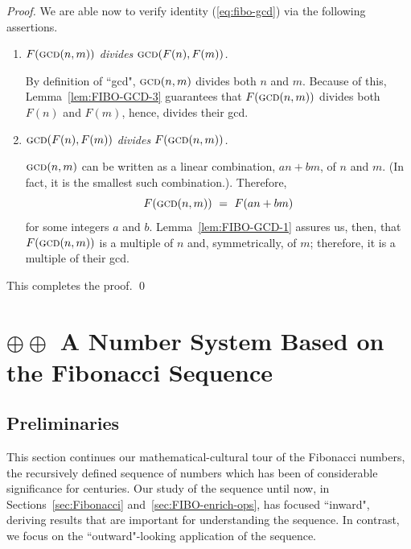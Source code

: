 \begin{proof}
\medskip

\noindent
We are able now to verify identity (\ref{eq:fibo-gcd}) via the following assertions.

\medskip

\begin{enumerate}
\item
{\em $F(\mbox{\sc gcd}(n,m))$ divides $\mbox{\sc gcd}(F(n), F(m))$.}

\smallskip

By definition of ``{\sc gcd}", $\mbox{\sc gcd}(n,m)$ divides both $n$ and $m$.  Because of this,
Lemma~\ref{lem:FIBO-GCD-3} guarantees that $F(\mbox{\sc gcd}(n,m))$ divides both $F(n)$ and $F(m)$, hence, divides their {\sc gcd}.

\medskip

\item
{\em $\mbox{\sc gcd}(F(n), F(m))$ divides $F(\mbox{\sc gcd}(n,m))$.}

\smallskip

$\mbox{\sc gcd}(n,m)$ can be written as a linear combination, $a n + b m$, of $n$ and $m$.  (In fact, it is the smallest such combination.). Therefore, 
\[ F(\mbox{\sc gcd}(n,m)) \ = \ F(a n + b m) \]
for some integers $a$ and $b$.  Lemma~\ref{lem:FIBO-GCD-1} assures us, then, that
$F(\mbox{\sc gcd}(n,m))$ is a multiple of $n$ and, symmetrically, of $m$; therefore, it is a multiple of their {\sc gcd}. 
\end{enumerate}
This completes the proof.   \qed
\end{proof}


\section{$\oplus \oplus$ A Number System Based on the Fibonacci Sequence}
\label{sec:numerals-special-families}
\label{sec:Fibo-numbers}

\subsection{Preliminaries}
\label{sec:FIBO-num-intro}

This section continues our mathematical-cultural tour of the Fibonacci numbers, the recursively defined sequence of numbers which has been of considerable significance for centuries.  Our study of the sequence until now, in Sections~\ref{sec:Fibonacci} and~\ref{sec:FIBO-enrich-ops}, has focused ``inward", deriving results that are important for understanding the sequence.  In contrast, we focus on the ``outward"-looking application of the sequence.

